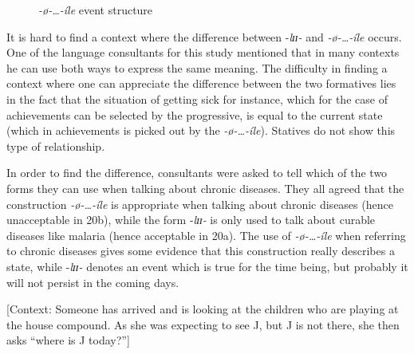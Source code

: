 \documentclass[output=paper,newtxmath,modfonts,nonflat,draftmode]{langsci/langscibook}
\begin{document}
\begin{figure}
\caption{\textit{-ø-…-íle} event structure\label{fig:kanijo:8}}
\end{figure}

It is hard to find a context where the difference between -\textit{lɪɪ-} and \textit{-ø-…-íle} occurs. One of the language consultants for this study mentioned that in many contexts he can use both ways to express the same meaning. The difficulty in finding a context where one can appreciate the difference between the two formatives lies in the fact that the situation of getting sick for instance, which for the case of achievements can be selected by the progressive, is equal to the current state (which in achievements is picked out by the \textit{-ø-…-íle}). Statives do not show this type of relationship.

In order to find the difference, consultants were asked to tell which of the two forms they can use when talking about chronic diseases. They all agreed that the construction \textit{-ø-…-íle} is appropriate when talking about chronic diseases (hence unacceptable in 20b), while the form -\textit{lɪɪ-} is only used to talk about curable diseases like malaria (hence acceptable in 20a). The use of \textit{-ø-…-íle} when referring to chronic diseases gives some evidence that this construction really describes a state, while -\textit{lɪɪ-} denotes an event which is true for the time being, but probably it will not persist in the coming days. 

\ea{}\label{ex:kanijo:20}
[Context: Someone has arrived and is looking at the children who are playing at the house compound. As she was expecting to see J, but J is not there, she then asks “where is J today?”] 



\z
\z
\end{document}
